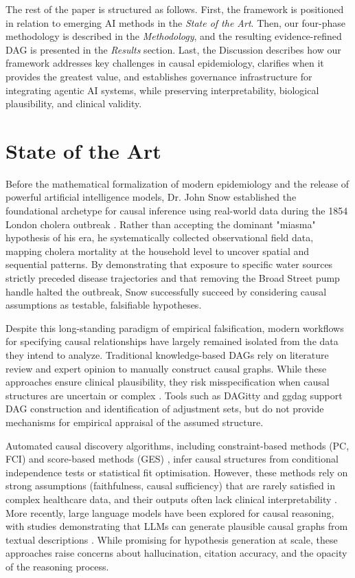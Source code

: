 \documentclass[sn-vancouver-num]{sn-jnl}
\begin{document}
The rest of the paper is structured as follows. First, the framework is positioned in relation to emerging AI methods in the \textit{State of the Art}. Then, our four-phase methodology is described in the \textit{Methodology}, and the resulting evidence-refined DAG is presented in the \textit{Results} section. Last, the Discussion describes how our framework addresses key challenges in causal epidemiology, clarifies when it provides the greatest value, and establishes governance infrastructure for integrating agentic AI systems, while preserving interpretability, biological plausibility, and clinical validity.

\section{State of the Art}
Before the mathematical formalization of modern epidemiology and the release of powerful artificial intelligence models, Dr. John Snow established the foundational archetype for causal inference using real-world data during the 1854 London cholera outbreak \citep{dayal2023john}. Rather than accepting the dominant "miasma" hypothesis of his era, he systematically collected observational field data, mapping cholera mortality at the household level to uncover spatial and sequential patterns. By demonstrating that exposure to specific water sources strictly preceded disease trajectories and that removing the Broad Street pump handle halted the outbreak, Snow successfully succeed by considering causal assumptions as testable, falsifiable hypotheses.

Despite this long-standing paradigm of empirical falsification, modern workflows for specifying causal relationships have largely remained isolated from the data they intend to analyze. Traditional knowledge-based DAGs \citep{vanderweele2019,pearl2010,pearl2009,greenland1999,hernan2004} rely on literature review and expert opinion to manually construct causal graphs. While these approaches ensure clinical plausibility, they risk misspecification when causal structures are uncertain or complex \citep{digitale2022,tennant2021}. Tools such as DAGitty and ggdag support DAG construction and identification of adjustment sets, but do not provide mechanisms for empirical appraisal of the assumed structure. 

Automated causal discovery algorithms, including constraint-based methods (PC, FCI) and score-based methods (GES) \citep{glymour2019,chickering2002}, infer causal structures from conditional independence tests or statistical fit optimisation. However, these methods rely on strong assumptions (faithfulness, causal sufficiency) that are rarely satisfied in complex healthcare data, and their outputs often lack clinical interpretability \citep{pearl2009,glymour2019}. More recently, large language models have been explored for causal reasoning, with studies demonstrating that LLMs can generate plausible causal graphs from textual descriptions \citep{kiciman2023,meier2025}. While promising for hypothesis generation at scale, these approaches raise concerns about hallucination, citation accuracy, and the opacity of the reasoning process.
\end{document}
